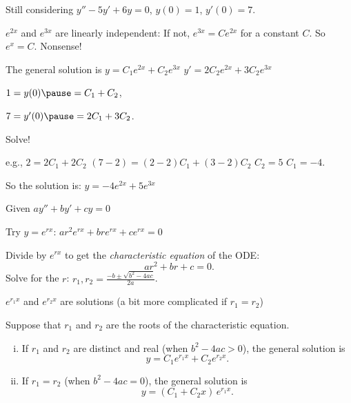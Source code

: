 \documentclass[10pt,aspectratio=169]{beamer}
\begin{document}
\begin{frame}
Still considering
\qquad $y''-5y'+6y = 0$, \qquad $y(0) = 1$, \qquad $y'(0) = 7$.

\medskip

$e^{2x}$ and $e^{3x}$ are linearly independent:
\pause
If not, $e^{3x} = C e^{2x}$ for a constant $C$.
\pause
So $e^x = C$.
\pause
Nonsense!

\medskip
\pause

The general solution is \quad $y = C_1 e^{2x} + C_2 e^{3x}$
\pause
\qquad
$y' = 2 C_2 e^{2x} + 3 C_2 e^{3x}$

\medskip
\pause

$1 = y(0) \pause = C_1 + C_2$,

\medskip
\pause

$7 = y'(0) \pause = 2 C_1 + 3 C_2$.

\medskip
\pause

Solve!

\pause
e.g., $2 = 2C_1 + 2C_2$
\pause\wthus
$(7-2) = (2-2)C_1 + (3-2)C_2$
\pause
\wthus
$C_2 = 5$
\wthus
\pause
$C_1 = -4$.

\medskip
\pause

So the solution is: \quad
$y = -4 e^{2x} + 5 e^{3x}$

\end{frame}

\begin{frame}
Given
\quad
$a y'' + b y' + c y = 0$

\medskip
\pause

Try $y = e^{rx}$:
\quad
$a r^2 e^{rx} + 
b r e^{rx} + 
c e^{rx} = 0$

\medskip
\pause
Divide by $e^{rx}$ to get the
\emph{characteristic equation} of the ODE:
\[
a r^2 + 
b r + 
c = 0 .
\]
\pause
Solve for the $r$:
\qquad 
$r_1, r_2 = \frac{-b \pm \sqrt{b^2 - 4ac}}{2a}$.

\medskip
\pause

\wthus $e^{r_1 x}$ and $e^{r_2 x}$ are solutions (a bit more complicated if
$r_1=r_2$)

\pause
\begin{theorem}
Suppose that $r_1$ and $r_2$ are the roots of the characteristic equation.
\begin{enumerate}[(i)]
\item\pause
If $r_1$ and $r_2$ are distinct and real (when $b^2 - 4ac > 0$),
the general solution is
\[
y = C_1 e^{r_1 x} + C_2 e^{r_2 x} .
\]
\item
\pause
If $r_1 = r_2$ (when $b^2 - 4ac = 0$), 
the general solution is
\[
y = (C_1 + C_2 x)\, e^{r_1 x} .
\]
\end{enumerate}
\end{theorem}
\end{frame}
\end{document}

